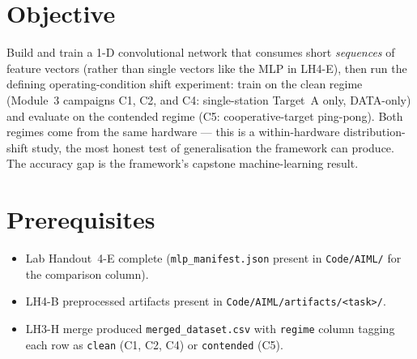 \documentclass[11pt,letterpaper]{article}
\begin{document}

\section{Objective}
Build and train a 1-D convolutional network that consumes short \emph{sequences} of feature vectors (rather than single vectors like the \mbox{MLP} in LH4-E), then run the defining operating-condition shift experiment: train on the clean regime (Module~3 campaigns C1, C2, and C4: single-station Target~A only, DATA-only) and evaluate on the contended regime (C5: cooperative-target ping-pong). Both regimes come from the same hardware --- this is a within-hardware distribution-shift study, the most honest test of generalisation the framework can produce. The accuracy gap is the framework's capstone machine-learning result.

\section{Prerequisites}
\begin{itemize}[leftmargin=2em]
	\item Lab Handout~4-E complete (\texttt{mlp\_manifest.json} present in \texttt{Code/AIML/} for the comparison column).
	\item LH4-B preprocessed artifacts present in \texttt{Code/AIML/artifacts/<task>/}.
	\item LH3-H merge produced \texttt{merged\_dataset.csv} with \texttt{regime} column tagging each row as \texttt{clean} (C1, C2, C4) or \texttt{contended} (C5).
\end{itemize}
\end{document}
